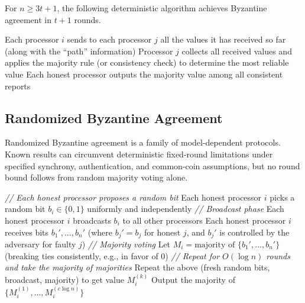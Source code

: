 \documentclass[twoside,12pt]{book}
\theoremstyle{plain}
\theoremstyle{definition}
\theoremstyle{remark}
\begin{document}
For $n \geq 3t + 1$, the following deterministic algorithm achieves Byzantine agreement in $t + 1$ rounds.

\begin{algorithm}[H]
\caption{Flood-Set Algorithm ($\mathrm{OM}(t+1)$)}
\label{alg:flood-set}
\begin{algorithmic}[1]
\State Each processor $i$ sends to each processor $j$ all the values it has received so far (along with the ``path'' information)
\State Processor $j$ collects all received values and applies the majority rule (or consistency check) to determine the most reliable value
\EndFor
\State Each honest processor outputs the majority value among all consistent reports
\EndProcedure
\end{algorithmic}
\end{algorithm}

\subsection{Randomized Byzantine Agreement}
\label{subsec:random-byzantine}

Randomized Byzantine agreement is a family of model-dependent protocols.
Known results can circumvent deterministic fixed-round limitations under
specified synchrony, authentication, and common-coin assumptions, but no
round bound follows from random majority voting alone.

\begin{algorithm}[H]
\caption{Randomized Byzantine Agreement (Constant-Round)}
\label{alg:random-byzantine}
\begin{algorithmic}[1]
\State \textit{// Each honest processor proposes a random bit}
\State Each honest processor $i$ picks a random bit $b_i \in \{0, 1\}$ uniformly and independently
\State \textit{// Broadcast phase}
\State Each honest processor $i$ broadcasts $b_i$ to all other processors
\State Each honest processor $i$ receives bits $b_1', \ldots, b_n'$ (where $b_j' = b_j$ for honest $j$, and $b_j'$ is controlled by the adversary for faulty $j$)
\State \textit{// Majority voting}
\State Let $M_i = \text{majority of } \{b_1', \ldots, b_n'\}$ (breaking ties consistently, e.g., in favor of 0)
\State \textit{// Repeat for $O(\log n)$ rounds and take the majority of majorities}
\State Repeat the above (fresh random bits, broadcast, majority) to get value $M_i^{(k)}$
\EndFor
\State Output the majority of $\{M_i^{(1)}, \ldots, M_i^{(c \log n)}\}$
\EndProcedure
\end{algorithmic}
\end{algorithm}
\end{document}
